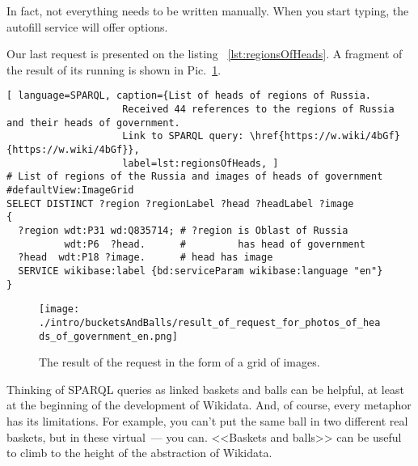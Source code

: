In fact, not everything needs to be written manually. When you start typing, the autofill service will offer options.

Our last request is presented on the listing ~\ref{lst:regionsOfHeads}. A fragment of the result of its running is shown in Pic.~\ref{fig:Result_of_the_request}.

\begin{lstlisting}[ language=SPARQL, caption={List of heads of regions of Russia. 
                    Received 44 references to the regions of Russia and their heads of government. 
                    Link to SPARQL query: \href{https://w.wiki/4bGf}{https://w.wiki/4bGf}},
                    label=lst:regionsOfHeads, ]
# List of regions of the Russia and images of heads of government
#defaultView:ImageGrid
SELECT DISTINCT ?region ?regionLabel ?head ?headLabel ?image
{
  ?region wdt:P31 wd:Q835714; # ?region is Oblast of Russia
          wdt:P6  ?head.      #         has head of government
  ?head  wdt:P18 ?image.      # head has image
  SERVICE wikibase:label {bd:serviceParam wikibase:language "en"} 
}
\end{lstlisting}

\begin{figure}[h!]
\texttt{[image: ./intro/bucketsAndBalls/result\_of\_request\_for\_photos\_of\_heads\_of\_government\_en.png]}
\caption{The result of the request in the form of a grid of images.}
\label{fig:Result_of_the_request}
\end{figure}

Thinking of SPARQL queries as linked baskets and balls can be helpful, at least at the beginning of the development of Wikidata. And, of course, every metaphor has its limitations. For example, you can't put the same ball in two different real baskets, but in these virtual~--- you can. <<Baskets and balls>> can be useful to climb to the height of the abstraction of Wikidata.
